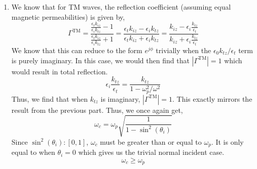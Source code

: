 \documentclass[12pt]{article}
\begin{document}
\begin{enumerate}
\begin{enumerate}
		\item [(c)]
		We know that for TM waves, the reflection coefficient (assuming equal magnetic permeabilities) is given by,
		\[\Gamma^{\mathrm{TM}}=\frac{\frac{\epsilon_tk_{iz}}{\epsilon_ik_{tz}}-1}{\frac{\epsilon_tk_{iz}}{\epsilon_ik_{tz}}+1}=\frac{\epsilon_tk_{iz}-\epsilon_ik_{tz}}{\epsilon_tk_{iz}+\epsilon_i k_{tz}}=\frac{k_{iz}-\epsilon_i\frac{k_{tz}}{\epsilon_t}}{k_{iz}+\epsilon_i\frac{k_{tz}}{\epsilon_t}}\]
		We know that this can reduce to the form $e^{j\phi}$ trivially when the $\epsilon_0k_{tz}/\epsilon_t$ term is purely imaginary.
		In this case, we would then find that $|\Gamma^{\mathrm{TM}}|=1$ which would result in total reflection.
		\[\epsilon_i\frac{k_{tz}}{\epsilon_t}=\frac{k_{tz}}{1-\omega_p^2/\omega^2}\]
		Thus, we find that when $k_{tz}$ is imaginary, $|\Gamma^{\mathrm{TM}}|=1$.
		This exactly mirrors the result from the previous part.
		Thus, we once again get,
		\[\boxed{\omega_c=\omega_p\sqrt{\frac{1}{1-\sin^2(\theta_i)}}}\]
		Since $\sin^2(\theta_i):[0,1]$, $\omega_c$ must be greater than or equal to $\omega_p$. 
		It is only equal to when $\theta_i=0$ which gives us the trivial normal incident case.
		\[\boxed{\omega_c\geq \omega_p}\]


\end{enumerate}
\end{enumerate}
\end{document}
